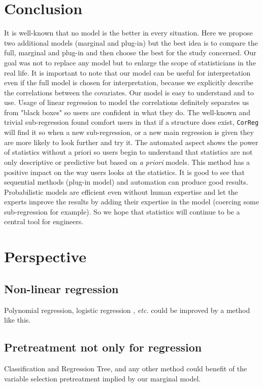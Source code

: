 \documentclass[12pt,a4paper]{report}
\begin{document}
	\section{Conclusion}
		It is well-known that no model is the better in every situation. Here we propose two additional models (marginal and plug-in) but the best idea is to compare the full, marginal and plug-in and then choose the best for the study concerned. Our goal was not to replace any model but to enlarge the scope of statisticians in the real life. It is important to note that our model can be useful for interpretation even if the full model is chosen for interpretation, because we explicitly describe the correlations between the covariates.
		Our model is easy to understand and to use. Usage of linear regression to model the correlations definitely separates us from "black boxes" so users are confident in what they do. The well-known and trivial sub-regression found comfort users in that if a structure does exist, {\tt CorReg} will find it so when a new sub-regression, or a new main regression is given they are more likely to look further and try it. The automated aspect shows the power of statistics without a priori so users begin to understand that statistics are not only descriptive or predictive but based on {\it a priori} models. This method has a positive impact on the way users looks at the statistics.
			It is good to see that sequential methods (plug-in model) and automation can produce good results. Probabilistic models are efficient even without human expertise and let the experts improve the results by adding their expertise in the model (coercing some sub-regression for example). So we hope that statistics will continue to be a central tool for engineers.
		
		
	\section{Perspective}
		\subsection{Non-linear regression}
			Polynomial regression, logistic regression \cite{hosmer2000applied}, {\it etc.} could be improved by a method like this.
		\subsection{Pretreatment not only for regression}
			Classification and Regression Tree, and any other method could benefit of the variable selection pretreatment implied by our marginal model.
\end{document}
